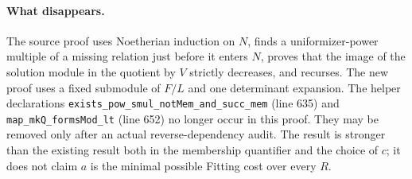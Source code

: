 \documentclass[11pt]{article}
\theoremstyle{remark}\newtheorem{remark}[theorem]{Remark}
\begin{document}
\paragraph{What disappears.} The source proof uses Noetherian induction on $N$, finds a uniformizer-power multiple of a missing relation just before it enters $N$, proves that the image of the solution module in the quotient by $V$ strictly decreases, and recurses. The new proof uses a fixed submodule of $F/L$ and one determinant expansion. The helper declarations \texttt{exists\_pow\_smul\_notMem\_and\_succ\_mem} (line 635) and \texttt{map\_mkQ\_formsMod\_lt} (line 652) no longer occur in this proof. They may be removed only after an actual reverse-dependency audit. The result is stronger than the existing result both in the membership quantifier and the choice of $c$; it does not claim $a$ is the minimal possible Fitting cost over every $R$.
\end{document}
